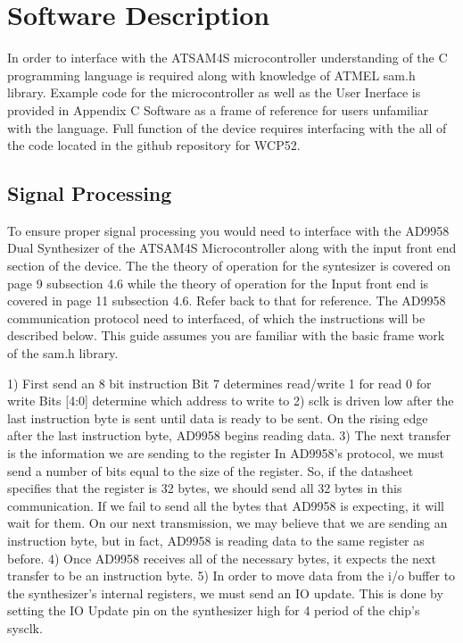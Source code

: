 \section{Software Description}
In order to interface with the ATSAM4S microcontroller understanding of the C programming language is required along with knowledge of ATMEL sam.h library. Example code for the microcontroller as well as the User Inerface is provided in Appendix C Software as a frame of reference for users unfamiliar with the language.  Full function of the device requires interfacing with the all of the code located in the github repository for WCP52.
\subsection{Signal Processing}
To ensure proper signal processing you would need to interface with the AD9958 Dual Synthesizer of the ATSAM4S Microcontroller along with the input front end section of the device. The  the theory of operation for the syntesizer is covered on page 9 subsection 4.6 while the theory of operation for the Input front end  is covered in page 11 subsection 4.6. Refer back to that for reference. The AD9958 communication protocol need to interfaced, of which the instructions will be described below. This guide assumes you are familiar with the basic frame work of the  sam.h library.

1) First send an 8 bit instruction
	Bit 7 determines read/write
		1 for read
		0 for write
	Bits [4:0] determine which address to write to
2) sclk is driven low after the last instruction byte is sent until data is ready to be sent. On the rising edge after the last instruction byte, AD9958 begins reading data.
3) The next transfer is the information we are sending to the register
	In AD9958's protocol, we must send a number of bits equal to the size of the register. So, if the datasheet specifies that the register is 32 bytes, we should send all 32 bytes in this communication.
	If we fail to send all the bytes that AD9958 is expecting, it will wait for them. On our next transmission, we may believe that we are sending an instruction byte, but in fact, AD9958 is reading data to the same register as before.
4) Once AD9958 receives all of the necessary bytes, it expects the next transfer to be an instruction byte.
5) In order to move data from the i/o buffer to the synthesizer's internal registers, we must send an IO update. This is done by setting the IO Update pin on the synthesizer high for 4 period of the chip's sysclk.


